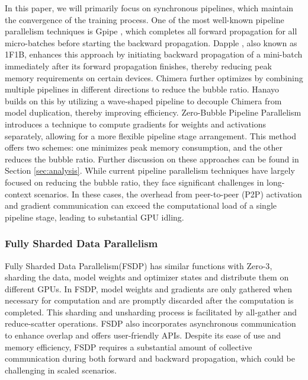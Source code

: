 \documentclass[sigplan,review,anonymous]{acmart}
\begin{document}
In this paper, we will primarily focus on synchronous pipelines, which maintain the convergence of the training process. One of the most well-known pipeline parallelism techniques is Gpipe \cite{gpipe}, which completes all forward propagation for all micro-batches before starting the backward propagation. Dapple \cite{dapple}, also known as 1F1B, enhances this approach by initiating backward propagation of a mini-batch immediately after its forward propagation finishes, thereby reducing peak memory requirements on certain devices. Chimera \cite{li2021chimera} further optimizes by combining multiple pipelines in different directions to reduce the bubble ratio. Hanayo builds on this by utilizing a wave-shaped pipeline to decouple Chimera from model duplication, thereby improving efficiency. Zero-Bubble Pipeline Parallelism \cite{qi2023zerobubblepipelineparallelism} introduces a technique to compute gradients for weights and activations separately, allowing for a more flexible pipeline stage arrangement. This method offers two schemes: one minimizes peak memory consumption, and the other reduces the bubble ratio. Further discussion on these approaches can be found in Section \ref{sec:analysis}. While current pipeline parallelism techniques have largely focused on reducing the bubble ratio, they face significant challenges in long-context scenarios. In these cases, the overhead from peer-to-peer (P2P) activation and gradient communication can exceed the computational load of a single pipeline stage, leading to substantial GPU idling.


\subsubsection{Fully Sharded Data Parallelism}

Fully Sharded Data Parallelism(FSDP)\cite{zhao2023pytorchfsdpexperiencesscaling} has similar functions with Zero-3\cite{rajbhandari2020zeromemoryoptimizationstraining}, sharding the data, model weights and optimizer states and distribute them on different GPUs. In FSDP, model weights and gradients are only gathered when necessary for computation and are promptly discarded after the computation is completed. This sharding and unsharding process is facilitated by all-gather and reduce-scatter operations. FSDP also incorporates asynchronous communication to enhance overlap and offers user-friendly APIs. Despite its ease of use and memory efficiency, FSDP requires a substantial amount of collective communication during both forward and backward propagation, which could be challenging in scaled scenarios.
\end{document}
